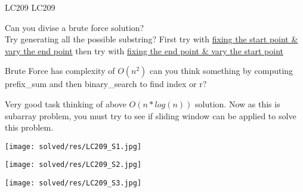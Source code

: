 \begin{problem}{LC209}
    LC209
\end{problem}

\begin{guide}
    Can you divise a brute force solution? \\
    Try generating all the possible substring? First try with \underline{fixing the start point \& vary the end point} then try with \underline{fixing the end point \& vary the start point}

    Brute Force has complexity of ${O(n^2)}$ can you think something by computing prefix\_sum and then binary\_search to find index or r?

    Very good task thinking of above $O(n*log(n))$ solution. Now as this is subarray problem, you must try to see if sliding window can be applied to solve this problem.

\end{guide}

\begin{solution}
    
    \texttt{[image: solved/res/LC209\_S1.jpg]}
\end{solution}

\begin{solution}

    \texttt{[image: solved/res/LC209\_S2.jpg]}
    
\end{solution}

\begin{solution}
    \texttt{[image: solved/res/LC209\_S3.jpg]}
    
\end{solution}